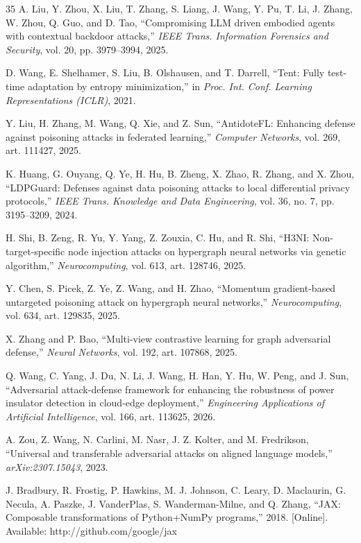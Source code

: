 \documentclass[journal]{IEEEtran}
\begin{document}
\begin{thebibliography}{35}
A. Liu, Y. Zhou, X. Liu, T. Zhang, S. Liang, J. Wang, Y. Pu, T. Li, J. Zhang,
W. Zhou, Q. Guo, and D. Tao, ``Compromising LLM driven embodied agents with
contextual backdoor attacks,'' \emph{IEEE Trans. Information Forensics and
Security}, vol. 20, pp. 3979--3994, 2025.

D. Wang, E. Shelhamer, S. Liu, B. Olshausen, and T. Darrell, ``Tent: Fully test-time
adaptation by entropy minimization,'' in \emph{Proc. Int. Conf. Learning
Representations (ICLR)}, 2021.

Y. Liu, H. Zhang, M. Wang, Q. Xie, and Z. Sun, ``AntidoteFL: Enhancing defense
against poisoning attacks in federated learning,'' \emph{Computer Networks},
vol. 269, art. 111427, 2025.

K. Huang, G. Ouyang, Q. Ye, H. Hu, B. Zheng, X. Zhao, R. Zhang, and X. Zhou,
``LDPGuard: Defenses against data poisoning attacks to local differential privacy
protocols,'' \emph{IEEE Trans. Knowledge and Data Engineering}, vol. 36, no. 7,
pp. 3195--3209, 2024.

H. Shi, B. Zeng, R. Yu, Y. Yang, Z. Zouxia, C. Hu, and R. Shi, ``H3NI:
Non-target-specific node injection attacks on hypergraph neural networks via genetic
algorithm,'' \emph{Neurocomputing}, vol. 613, art. 128746, 2025.

Y. Chen, S. Picek, Z. Ye, Z. Wang, and H. Zhao, ``Momentum gradient-based untargeted
poisoning attack on hypergraph neural networks,'' \emph{Neurocomputing}, vol. 634,
art. 129835, 2025.

X. Zhang and P. Bao, ``Multi-view contrastive learning for graph adversarial
defense,'' \emph{Neural Networks}, vol. 192, art. 107868, 2025.

Q. Wang, C. Yang, J. Du, N. Li, J. Wang, H. Han, Y. Hu, W. Peng, and J. Sun,
``Adversarial attack-defense framework for enhancing the robustness of power
insulator detection in cloud-edge deployment,'' \emph{Engineering Applications of
Artificial Intelligence}, vol. 166, art. 113625, 2026.

A. Zou, Z. Wang, N. Carlini, M. Nasr, J. Z. Kolter, and M. Fredrikson, ``Universal
and transferable adversarial attacks on aligned language models,''
\emph{arXiv:2307.15043}, 2023.

J. Bradbury, R. Frostig, P. Hawkins, M. J. Johnson, C. Leary, D. Maclaurin,
G. Necula, A. Paszke, J. VanderPlas, S. Wanderman-Milne, and Q. Zhang, ``JAX:
Composable transformations of Python+NumPy programs,'' 2018. [Online]. Available:
http://github.com/google/jax


\end{thebibliography}
\end{document}
